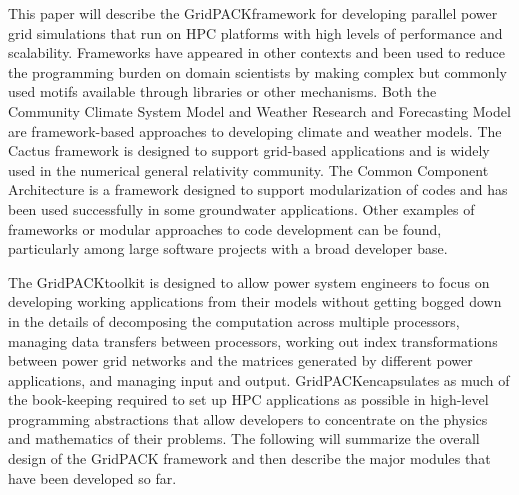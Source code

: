 \documentclass{acm_proc_article-sp}
\begin{document}
This paper will describe the GridPACK\texttrademark framework for developing parallel
power grid simulations that run on HPC platforms with high levels of
performance and scalability. Frameworks have appeared in other contexts and been
used to reduce the programming burden on domain scientists by making complex
but commonly used motifs available through libraries or other mechanisms.
Both the Community Climate System Model\cite{CCSM} and Weather Research
and Forecasting Model\cite{WRF} are framework-based
approaches to developing climate and weather models. The Cactus framework is
designed to support grid-based applications and is widely used in the numerical
general relativity community\cite{CACTUS}. The Common Component
Architecture\cite{CCA} is a framework
designed to support modularization of codes and has been used successfully in
some groundwater applications\cite{SPH}. Other examples of frameworks or modular approaches
to code development can be found, particularly among large software projects
with a broad developer base.

The GridPACK\texttrademark toolkit is designed to allow power
system engineers to focus on developing working applications from their
models without getting bogged down in the details of decomposing the computation
across multiple processors, managing data transfers between processors, working out
index transformations between power grid networks and the matrices generated by
different power applications, and managing input and output.
GridPACK\texttrademark encapsulates as much of the book-keeping required to set up HPC
applications as possible in high-level programming abstractions that allow developers
to concentrate on the physics and mathematics of their problems.
The following will summarize the overall design of the GridPACK\texttrademark
framework and then
describe the major modules that have been developed so far.
\end{document}
